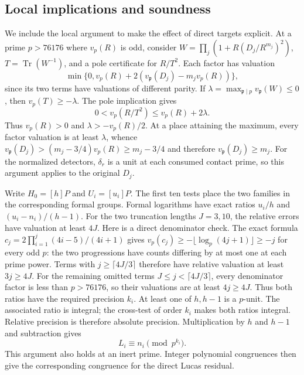 \documentclass[11pt,a4paper]{article}
\theoremstyle{definition}
\theoremstyle{remark}
\begin{document}
\subsection{Local implications and soundness}

We include the local argument to make the effect of direct targets
explicit.  At a prime $p>76176$ where $v_p(R)$ is odd, consider
$W=\prod_j(1+R(D_j/R^{m_j})^2)$, $T=\operatorname{Tr}(W^{-1})$,
and a pole certificate for $R/T^2$.  Each factor has valuation
\[
 \min\{0,v_p(R)+2(v_{\mathfrak p}(D_j)-m_jv_p(R))\},
\]
since its two terms have valuations of different parity.  If
$\lambda=\max_{\mathfrak p\mid p}v_{\mathfrak p}(W)\le0$, then
$v_p(T)\ge-\lambda$.  The pole implication gives
\[
                 0<v_p(R/T^2)\le v_p(R)+2\lambda.
\]
Thus $v_p(R)>0$ and $\lambda>-v_p(R)/2$.  At a place attaining
the maximum, every factor valuation is at least $\lambda$, whence
$v_{\mathfrak p}(D_j)>(m_j-3/4)v_p(R)\ge m_j-3/4$ and therefore
$v_{\mathfrak p}(D_j)\ge m_j$.
For the normalized detectors, $\delta_r$ is a unit at each consumed
contact prime, so this argument applies to the original $D_j$.

Write $H_0=[h]P$ and $U_i=[u_i]P$.  The first ten tests place the
two families in the corresponding formal groups.  Formal logarithms
have exact ratios $u_i/h$ and $(u_i-n_i)/(h-1)$.
For the two truncation lengths $J=3,10$, the relative errors have
valuation at least $4J$. Here is a direct denominator check. The exact
formula $c_j=2\prod_{i=1}^j(4i-5)/(4i+1)$ gives
$v_p(c_j)\ge-\lfloor\log_p(4j+1)\rfloor\ge-j$ for every odd $p$:
the two progressions have counts differing by at most one at each
prime power. Terms with $j\ge\lceil4J/3\rceil$ therefore have
relative valuation at least $3j\ge4J$. For the remaining omitted
terms $J\le j<\lceil4J/3\rceil$, every denominator factor is less
than $p>76176$, so their valuations are at least $4j\ge4J$.
Thus both ratios have the required precision $k_i$.  At least one of $h,h-1$ is a $p$-unit.
The associated ratio is integral; the cross-test of order $k_i$
makes both ratios integral.  Relative precision is therefore absolute
precision.  Multiplication by $h$ and $h-1$ and subtraction gives
\[
                  L_i\equiv n_i\pmod{p^{k_i}}.
\]
This argument also holds at an inert prime.  Integer polynomial
congruences then give the corresponding congruence for the direct
Lucas residual.
\end{document}
